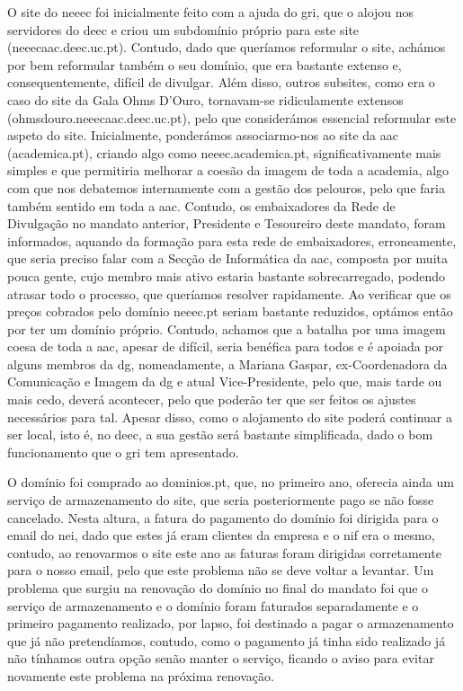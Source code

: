 O site do \acrshort{neeec} foi inicialmente feito com a ajuda do \acrshort{gri}, que o alojou nos servidores do \acrshort{deec} e criou um subdomínio próprio para este site (neeecaac.deec.uc.pt). Contudo, dado que queríamos reformular o site, achámos por bem reformular também o seu domínio, que era bastante extenso e, consequentemente, difícil de divulgar. Além disso, outros subsites, como era o caso do site da Gala Ohms D'Ouro, tornavam-se ridiculamente extensos (ohmsdouro.neeecaac.deec.uc.pt), pelo que considerámos essencial reformular este aspeto do site. Inicialmente, ponderámos associarmo-nos ao site da \acrshort{aac} (academica.pt), criando algo como neeec.academica.pt, significativamente mais simples e que permitiria melhorar a coesão da imagem de toda a academia, algo com que nos debatemos internamente com a gestão dos pelouros, pelo que faria também sentido em toda a \acrshort{aac}. Contudo, os embaixadores da Rede de Divulgação no mandato anterior, Presidente e Tesoureiro deste mandato, foram informados, aquando da formação para esta rede de embaixadores, erroneamente, que seria preciso falar com a Secção de Informática da \acrshort{aac}, composta por muita pouca gente, cujo membro mais ativo estaria bastante sobrecarregado, podendo atrasar todo o processo, que queríamos resolver rapidamente. Ao verificar que os preços cobrados pelo domínio neeec.pt seriam bastante reduzidos, optámos então por ter um domínio próprio. Contudo, achamos que a batalha por uma imagem coesa de toda a \acrshort{aac}, apesar de difícil, seria benéfica para todos e é apoiada por alguns membros da \acrshort{dg}, nomeadamente, a Mariana Gaspar, ex-Coordenadora da Comunicação e Imagem da \acrshort{dg} e atual Vice-Presidente, pelo que, mais tarde ou mais cedo, deverá acontecer, pelo que poderão ter que ser feitos os ajustes necessários para tal. Apesar disso, como o alojamento do site poderá continuar a ser local, isto é, no \acrshort{deec}, a sua gestão será bastante simplificada, dado o bom funcionamento que o \acrshort{gri} tem apresentado.

O domínio foi comprado ao dominios.pt, que, no primeiro ano, oferecia ainda um serviço de armazenamento do site, que seria posteriormente pago se não fosse cancelado. Nesta altura, a fatura do pagamento do domínio foi dirigida para o email do \acrshort{nei}, dado que estes já eram clientes da empresa e o \acrshort{nif} era o mesmo, contudo, ao renovarmos o site este ano as faturas foram dirigidas corretamente para o nosso email, pelo que este problema não se deve voltar a levantar. Um problema que surgiu na renovação do domínio no final do mandato foi que o serviço de armazenamento e o domínio foram faturados separadamente e o primeiro pagamento realizado, por lapso, foi destinado a pagar o armazenamento que já não pretendíamos, contudo, como o pagamento já tinha sido realizado já não tínhamos outra opção senão manter o serviço, ficando o aviso para evitar novamente este problema na próxima renovação.

